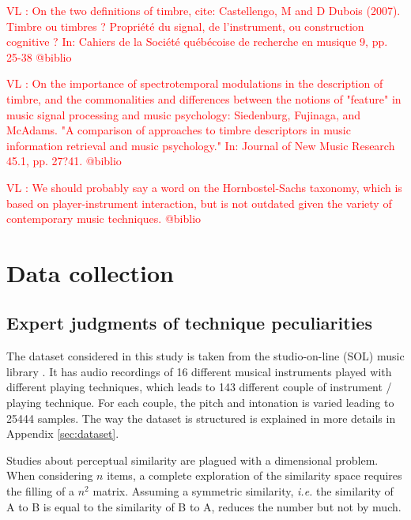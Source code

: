 \documentclass{article}
\newcommand{\vl}[1]{\textcolor{red}{VL : #1}}
\begin{document}
\vl{On the two definitions of timbre, cite:
Castellengo, M and D Dubois (2007). Timbre ou timbres ? Propri\'{e}t\'{e}
du signal, de l'instrument, ou construction cognitive ? In: Cahiers
de la Soci\'{e}t\'{e} qu\'{e}b\'{e}coise de recherche en musique 9, pp. 25-38
 @biblio}
 
\vl{On the importance of spectrotemporal modulations in the description
of timbre, and the commonalities and differences between the notions of
"feature" in music signal processing and music psychology:
Siedenburg, Fujinaga, and McAdams. "A comparison of
approaches to timbre descriptors in music information retrieval
and music psychology." In: Journal of New Music Research 45.1,
pp. 27?41. @biblio}

\vl{We should probably say a word on the Hornbostel-Sachs taxonomy,
which is based on player-instrument interaction, but is not outdated
given the variety of contemporary music techniques. @biblio}



\section{Data collection}\label{sec:xp1}


\subsection{Expert judgments of technique peculiarities}

The dataset considered in this study is taken from the studio-on-line (SOL) music library  \cite{peeters2000instrument}. It has audio recordings of 16 different musical instruments played with different playing techniques, which leads to 143 different couple of instrument / playing technique. For each couple, the pitch and intonation is varied leading to 25444 samples. The way the dataset is structured is explained in more details in Appendix \ref{sec:dataset}.

Studies about perceptual similarity are plagued with a dimensional problem. When considering $n$ items, a complete exploration of the similarity space requires the filling of a $n^2$ matrix. Assuming a symmetric similarity, \textit{i.e.} the similarity of A to B is equal to the similarity of B to A, reduces the number but not by much.
\end{document}
